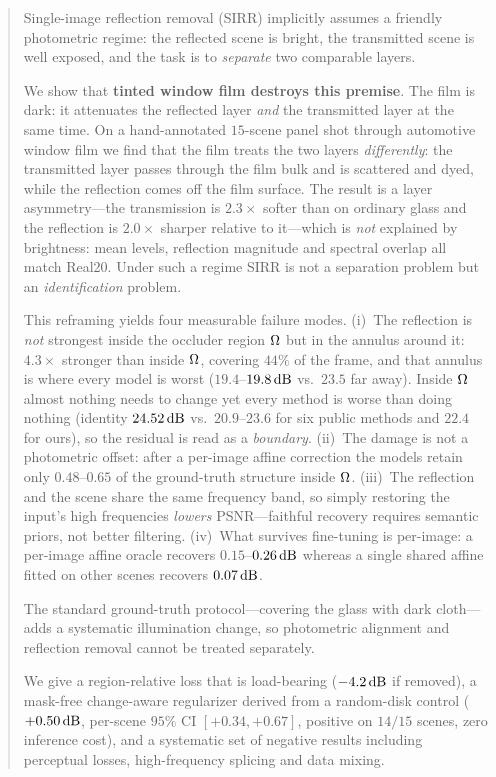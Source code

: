\begin{abstract}
Single-image reflection removal (SIRR) implicitly assumes a friendly photometric
regime: the reflected scene is bright, the transmitted scene is well exposed, and the
task is to \emph{separate} two comparable layers.

We show that \textbf{tinted window film destroys this premise}. The film is dark: it
attenuates the reflected layer \emph{and} the transmitted layer at the same time. On a
hand-annotated $15$-scene panel shot through automotive window film we find that the film
treats the two layers \emph{differently}: the transmitted layer passes through the film bulk and
is scattered and dyed, while the reflection comes off the film surface. The result is a layer
asymmetry---the transmission is $2.3\times$ softer than on ordinary glass and the reflection is
$2.0\times$ sharper relative to it---which is \emph{not} explained by brightness: mean levels,
reflection magnitude and spectral overlap all match Real20. Under such a regime SIRR is not a
separation problem but an \emph{identification} problem.

This reframing yields four measurable failure modes. (i)~The reflection is \emph{not}
strongest inside the occluder region $\Om$ but in the annulus around it: $4.3\times$ stronger than
inside $\Om$, covering $44\%$ of the frame, and that annulus is where every model is worst
($19.4$--$19.8\dBA$ vs.\ $23.5$ far away). Inside $\Om$ almost nothing needs to change yet every
method is worse than doing nothing (identity $24.52\dBA$ vs.\ $20.9$--$23.6$ for six public
methods and $22.4$ for ours), so the residual is read as a \emph{boundary}. (ii)~The damage is not a
photometric offset: after a per-image affine correction the models retain only
$0.48$--$0.65$ of the ground-truth structure inside $\Om$. (iii)~The reflection and the
scene share the same frequency band, so simply restoring the input's high frequencies
\emph{lowers} PSNR---faithful recovery requires semantic priors, not better filtering.
(iv)~What survives fine-tuning is per-image: a per-image affine oracle recovers
$0.15$--$0.26\dBA$ whereas a single shared affine fitted on other scenes recovers
$0.07\dBA$.

The standard ground-truth protocol---covering the glass with dark cloth---adds a
systematic illumination change, so photometric alignment and reflection removal cannot be
treated separately.

We give a region-relative loss that is load-bearing ($-4.2\dBA$ if removed), a mask-free
change-aware regularizer derived from a random-disk control ($+0.50\dBA$, per-scene
$95\%$ CI $[+0.34,+0.67]$, positive on $14/15$ scenes, zero inference cost), and a
systematic set of negative results including perceptual losses, high-frequency splicing
and data mixing.
\end{abstract}
